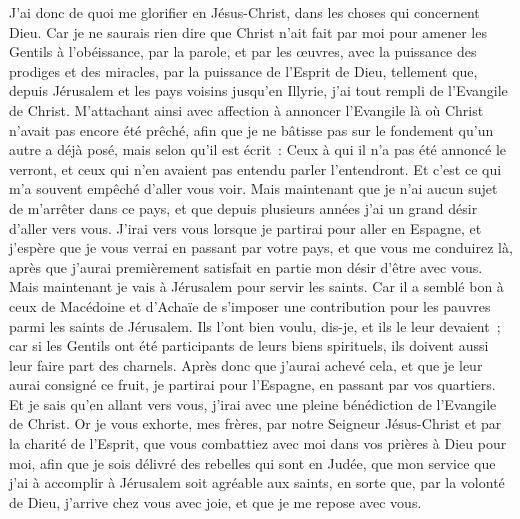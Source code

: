 \begin{multicols}{2}
J'ai donc de quoi me glorifier en Jésus-Christ, dans les choses qui concernent Dieu.
Car je ne saurais rien dire que Christ n'ait fait par moi pour amener les Gentils à l'obéissance, par la parole, et par les œuvres,
avec la puissance des prodiges et des miracles, par la puissance de l'Esprit de Dieu, tellement que, depuis Jérusalem et les pays voisins jusqu'en Illyrie, j'ai tout rempli de l'Evangile de Christ.
M'attachant ainsi avec affection à annoncer l'Evangile là où Christ n'avait pas encore été prêché, afin que je ne bâtisse pas sur le fondement qu'un autre a déjà posé, 
mais selon qu'il est écrit~: Ceux à qui il n'a pas été annoncé le verront, et ceux qui n'en avaient pas entendu parler l'entendront.
Et c'est ce qui m'a souvent empêché d'aller vous voir.
Mais maintenant que je n'ai aucun sujet de m'arrêter dans ce pays, et que depuis plusieurs années j'ai un grand désir d'aller vers vous.
J'irai vers vous lorsque je partirai pour aller en Espagne, et j'espère que je vous verrai en passant par votre pays, et que vous me conduirez là, après que j'aurai premièrement satisfait en partie mon désir d'être avec vous.
Mais maintenant je vais à Jérusalem pour servir les saints.
Car il a semblé bon à ceux de Macédoine et d'Achaïe de s'imposer une contribution pour les pauvres parmi les saints de Jérusalem.
Ils l'ont bien voulu, dis-je, et ils le leur devaient~; car si les Gentils ont été participants de leurs biens spirituels, ils doivent aussi leur faire part des charnels.
Après donc que j'aurai achevé cela, et que je leur aurai consigné ce fruit, je partirai pour l'Espagne, en passant par vos quartiers.
Et je sais qu'en allant vers vous, j'irai avec une pleine bénédiction de l'Evangile de Christ.
Or je vous exhorte, mes frères, par notre Seigneur Jésus-Christ et par la charité de l'Esprit, que vous combattiez avec moi dans vos prières à Dieu pour moi,
afin que je sois délivré des rebelles qui sont en Judée, que mon service que j'ai à accomplir à Jérusalem soit agréable aux saints,
en sorte que, par la volonté de Dieu, j'arrive chez vous avec joie, et que je me repose avec vous.

\end{multicols}
